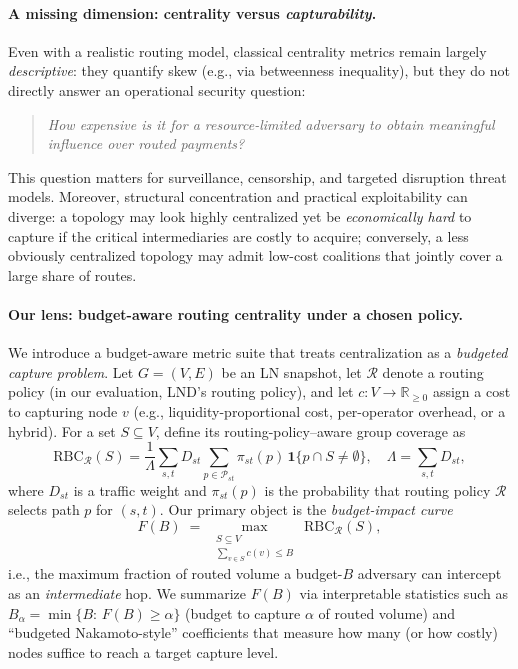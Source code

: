 \documentclass{article}
\begin{document}
\paragraph{A missing dimension: centrality versus \emph{capturability}.}
Even with a realistic routing model, classical centrality metrics remain largely \emph{descriptive}: they quantify skew (e.g., via betweenness inequality), but they do not directly answer an operational security question:
\begin{quote}
\emph{How expensive is it for a resource-limited adversary to obtain meaningful influence over routed payments?}
\end{quote}
This question matters for surveillance, censorship, and targeted disruption threat models. Moreover, structural concentration and practical exploitability can diverge: a topology may look highly centralized yet be \emph{economically hard} to capture if the critical intermediaries are costly to acquire; conversely, a less obviously centralized topology may admit low-cost coalitions that jointly cover a large share of routes.

\paragraph{Our lens: budget-aware routing centrality under a chosen policy.}
We introduce a budget-aware metric suite that treats centralization as a \emph{budgeted capture problem}. Let $G=(V,E)$ be an LN snapshot, let $\mathcal{R}$ denote a routing policy (in our evaluation, LND's routing policy), and let $c:V\rightarrow\mathbb{R}_{\ge 0}$ assign a cost to capturing node $v$ (e.g., liquidity-proportional cost, per-operator overhead, or a hybrid).
For a set $S\subseteq V$, define its routing-policy--aware group coverage as
\[
\mathrm{RBC}_{\mathcal{R}}(S)=\frac{1}{\Lambda}\sum_{s,t}D_{st}\sum_{p\in\mathcal{P}_{st}}\pi_{st}(p)\,\mathbf{1}\{p\cap S\neq\emptyset\},
\quad \Lambda=\sum_{s,t}D_{st},
\]
where $D_{st}$ is a traffic weight and $\pi_{st}(p)$ is the probability that routing policy $\mathcal{R}$ selects path $p$ for $(s,t)$.
Our primary object is the \emph{budget-impact curve}
\[
F(B)\;=\;\max_{\substack{S\subseteq V\\ \sum_{v\in S}c(v)\le B}}\ \mathrm{RBC}_{\mathcal{R}}(S),
\]
i.e., the maximum fraction of routed volume a budget-$B$ adversary can intercept as an \emph{intermediate} hop.
We summarize $F(B)$ via interpretable statistics such as $B_\alpha=\min\{B:\,F(B)\ge\alpha\}$ (budget to capture $\alpha$ of routed volume) and ``budgeted Nakamoto-style'' coefficients that measure how many (or how costly) nodes suffice to reach a target capture level.
\end{document}
